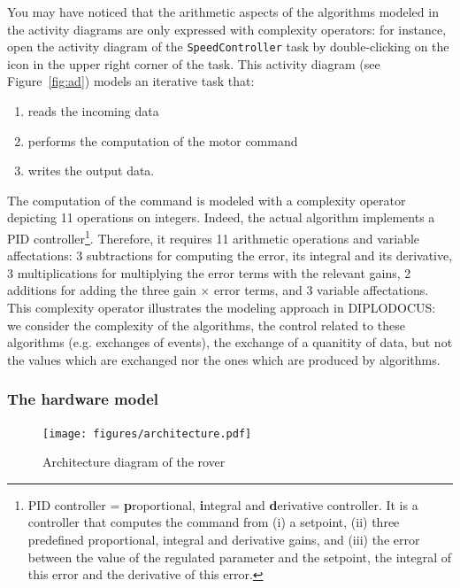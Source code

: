\documentclass{article}
\begin{document}
You may have noticed that the arithmetic aspects of the algorithms modeled in the activity diagrams are only expressed with complexity operators: for instance, open the activity diagram of the \texttt{SpeedController} task by double-clicking on the icon in the upper right corner of the task. This activity diagram (see Figure~\ref{fig:ad}) models an iterative task that:
\begin{enumerate}
	\item reads the incoming data
	\item performs the computation of the motor command
	\item writes the output data.
\end{enumerate}
The computation of the command is modeled with a complexity operator depicting 11 operations on integers. Indeed, the actual algorithm implements a PID controller\footnote{PID controller = \textbf{p}roportional, \textbf{i}ntegral and \textbf{d}erivative controller. It is a controller that computes the command from (i) a setpoint, (ii) three predefined proportional, integral and derivative gains, and (iii) the error between the value of the regulated parameter and the setpoint, the integral of this error and the derivative of this error.}. Therefore, it requires 11 arithmetic operations and variable affectations: 3 subtractions for computing the error, its integral and its derivative, 3 multiplications for multiplying the error terms with the relevant gains, 2 additions for adding the three gain $\times$ error terms, and 3 variable affectations. This complexity operator illustrates the modeling approach in DIPLODOCUS: we consider the complexity of the algorithms, the control related to these algorithms (e.g. exchanges of events), the exchange of a quanitity of data, but not the values which are exchanged nor the ones which are produced by algorithms.

\subsubsection{The hardware model}

\begin{figure}
	\hspace*{-1cm}
	\centering
	\texttt{[image: figures/architecture.pdf]}
	\caption{Architecture diagram of the rover}
	\label{fig:roverarchitecture}
\end{figure}
\end{document}
